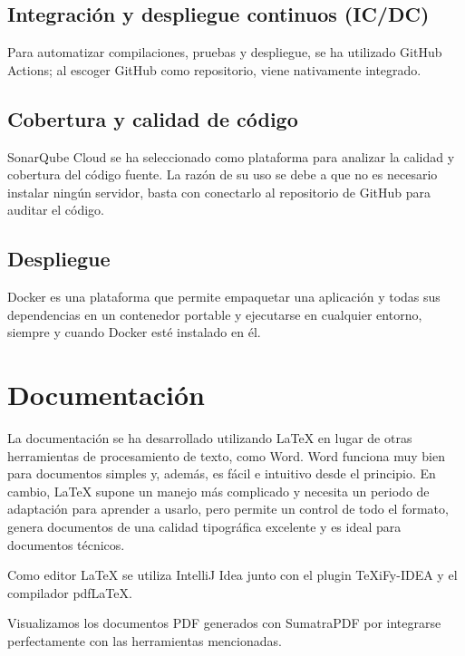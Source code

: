 \subsection{Integración y despliegue continuos (IC/DC)}\label{subsec:integracion_continua}

Para automatizar compilaciones, pruebas y despliegue, se ha utilizado GitHub Actions\cite{github:actions}; al
escoger GitHub como repositorio, viene nativamente integrado.

\subsection{Cobertura y calidad de código}\label{subsec:cobertura}

SonarQube Cloud\cite{sonarcloud:official} se ha seleccionado como plataforma para analizar la calidad y cobertura del código fuente.
La razón de su uso se debe a que no es necesario instalar ningún servidor, basta con conectarlo al repositorio de GitHub
para auditar el código.

\subsection{Despliegue}\label{subsec:despliegue}

Docker\cite{docker:official} es una plataforma que permite empaquetar una aplicación y todas sus dependencias en un
contenedor portable y ejecutarse en cualquier entorno, siempre y cuando Docker esté instalado en él.

\section{Documentación}\label{sec:documentacion}

La documentación se ha desarrollado utilizando LaTeX\cite{latex:official} en lugar de otras herramientas de procesamiento de texto, como Word.
Word funciona muy bien para documentos simples y, además, es fácil e intuitivo desde el principio.
En cambio, LaTeX supone un manejo más complicado y necesita un periodo de adaptación para aprender a usarlo, pero
permite un control de todo el formato, genera documentos de una calidad tipográfica
excelente y es ideal para documentos técnicos.

Como editor LaTeX se utiliza IntelliJ Idea junto con el plugin TeXiFy-IDEA y el compilador pdfLaTeX.

Visualizamos los documentos PDF generados con SumatraPDF por integrarse perfectamente con las herramientas
mencionadas.

